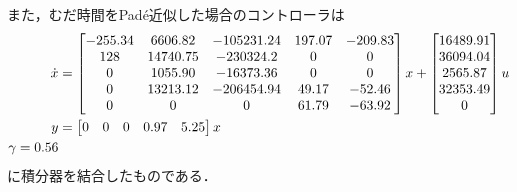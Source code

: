 また，むだ時間をPad\'e近似した場合のコントローラは
\begin{align}
    \dot{x} & =
    \begin{bmatrix}
        -255.34&6606.82&-105231.24&197.07&-209.83\\
        128&14740.75&-230324.2&0&0\\
        0&1055.90&-16373.36&0&0\\
        0&13213.12&-206454.94&49.17&-52.46\\
        0&0&0&61.79&-63.92
    \end{bmatrix}
    x+
    \begin{bmatrix}
    16489.91\\36094.04\\2565.87\\32353.49\\0
    \end{bmatrix}
    u           \\
    y       & =
    \begin{bmatrix}
    0&0&0&0.97&5.25
    \end{bmatrix}
    x\\ \notag
    \gamma = 0.56
\end{align}
に積分器を結合したものである．